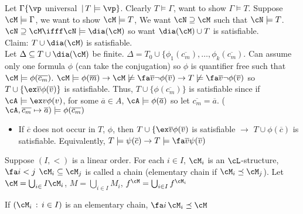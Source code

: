 \begin{pf}
    Let $\Gamma \{ \vp$ universal $\, | \, T \models \vp\}$. Clearly $T \models \Gamma$, want to show $\Gamma \models T$. Suppose $\cM \models \Gamma$, we want to show $\cM \models T$, We want $\cN \supseteq \cM$ such that $\cN \models T$. $\cN \supseteq \cM \ifff \cN \models \dia(\cM)$ so want $\dia(\cM) \cup T$ is satisfiable. \\
    Claim: $T \cup \dia(\cM)$ is satisfiable.  \\
    Let $\Delta \subseteq T \cup \dia(\cM)$ be finite. $\Delta = T_0 \cup \{\phi_1(\overline{c_m}), \ldots, \phi_k(\overline{c_m})$. Can assume only one formula $\phi$ (can take the conjugation) so $\phi$ is quantifier free such that $\cM \models \phi(\overline{c_m})$. $\cM \models \phi(\overline{m}) \to \cM \not\models \fa \overline{v} \neg \phi(\overline{v}) \to T \not\models \fa \overline{v} \neg \phi(\overline{v})$ so $T \cup \{\ex \overline{v} \phi(\overline{v})\}$ is satisfiable. Thus, $T \cup \{ \phi(\overline{c_m})\}$ is satisfiable since if $\cA \models \ex v \phi(v)$, for some $\overline{a} \in A$, $\cA \models \phi(\overline{a})$ so let $\overline{c_m} = \overline{a}$. ($\cA, \overline{c_m} \mapsto \overline{a}) \models \phi(\overline{c_m})$ 
\end{pf}

\begin{itemize}
    \item If $\overline{c}$ does not occur in $T$, $\phi$, then $T \cup \{ \ex \overline{v} \phi(\overline{v})$ is satisfiable $\to$ $T \cup \phi(\overline{c})$ is satisfiable. Equivalently, $T \models \psi(\overline{c}) \to T \models \fa \overline{v} \psi(\overline{v})$
\end{itemize}

\noindent
Suppose $(I, <)$ is a linear order. For each $i \in I$, $\cM_i$ is an $\cL$-structure, $\fa i < j$ $\cM_i \subseteq \cM_j$ is called a chain (elementary chain if $\cM_i \preceq \cM_j$). Let $\cM = \bigcup_{i\in} I\cM_i$, $M = \bigcup_{i \in I}M_i$, $f^{\cM} = \bigcup_{i\in I} f^{\cM_i}$ 

\begin{proposition}
    If $(\cM_i \, : \, i \in I)$ is an elementary chain, $\fa i \, \cM_i \preceq \cM$ 
\end{proposition}

